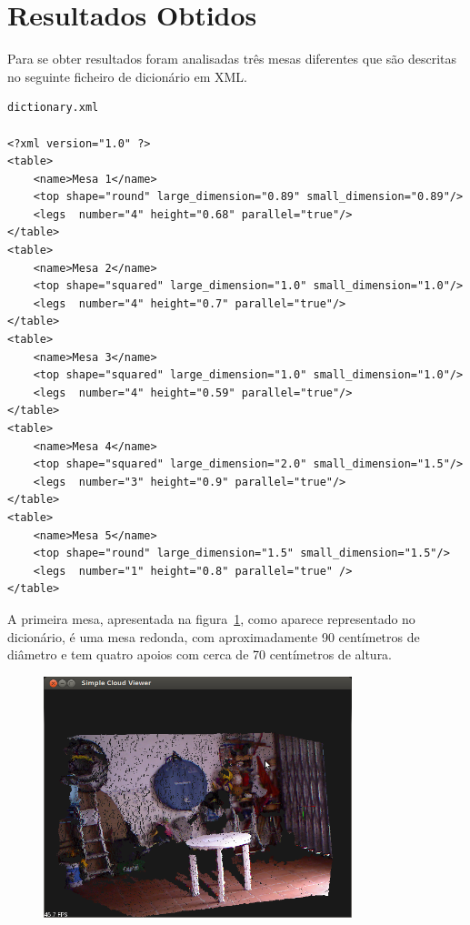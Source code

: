 \vspace*{12mm}




\section {Resultados Obtidos}

Para se obter resultados foram analisadas três mesas diferentes que são descritas no seguinte ficheiro de dicionário em XML. 

\begin{verbatim}
dictionary.xml

<?xml version="1.0" ?>
<table>
	<name>Mesa 1</name>
	<top shape="round" large_dimension="0.89" small_dimension="0.89"/>
	<legs  number="4" height="0.68" parallel="true"/>
</table>
<table>
	<name>Mesa 2</name>
	<top shape="squared" large_dimension="1.0" small_dimension="1.0"/>
	<legs  number="4" height="0.7" parallel="true"/>
</table>
<table>
	<name>Mesa 3</name>
	<top shape="squared" large_dimension="1.0" small_dimension="1.0"/>
	<legs  number="4" height="0.59" parallel="true"/>
</table>
<table>
	<name>Mesa 4</name>
	<top shape="squared" large_dimension="2.0" small_dimension="1.5"/>
	<legs  number="3" height="0.9" parallel="true"/>
</table>
<table>
	<name>Mesa 5</name>
	<top shape="round" large_dimension="1.5" small_dimension="1.5"/>
	<legs  number="1" height="0.8" parallel="true" />
</table>
\end{verbatim}



A primeira mesa, apresentada na figura~\ref{fig:mesa1}, como aparece representado no dicionário, é uma mesa redonda, com aproximadamente 90 centímetros de diâmetro e tem quatro apoios com cerca de 70 centímetros de altura.

\begin{figure}[htb]
\begin{center}
	\includegraphics[width=0.80\textwidth]{figures/exemplo_captura.png}
	\label{fig:mesa1}
\end{center}
\end{figure}

